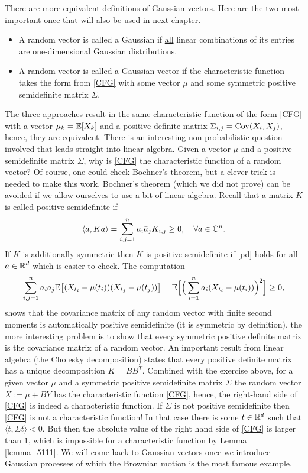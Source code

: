 There are more equivalent definitions of Gaussian vectors. Here are the two most important once that will also be used in next chapter.
\begin{itemize}
	\item A random vector is called a Gaussian if \underline{all} linear combinations of its entries are one-dimensional Gaussian distributions.
	\item A random vector is called a Gaussian vector if the characteristic function takes the form from \eqref{CFG} with some vector $\mu$ and some symmetric positive semidefinite matrix $\Sigma$.
\end{itemize}
The three approaches result in the same characteristic function of the form \eqref{CFG} with a vector $\mu_k=\mathbb{E}[X_k]$ and a positive definite matrix $\Sigma_{i,j}=\operatorname{Cov}(X_i,X_j)$, hence, they are equivalent. There is an interesting non-probabilistic question involved that leads straight into linear algebra. Given a vector $\mu$ and a positive semidefinite matrix $\Sigma$, why is \eqref{CFG} the characteristic function of a random vector? Of course, one could check Bochner's theorem, but a clever trick is needed to make this work. Bochner's theorem (which we did not prove) can be avoided if we allow ourselves to use a bit of linear algebra. Recall that a matrix $K$ is called positive semidefinite if 
\begin{align}\label{pd}
	\langle a, K a\rangle=\sum_{i,j=1}^n a_i\bar{a}_j K_{i,j}\geq 0,\quad \forall a\in \mathbb{C}^n.
\end{align}
If $K$ is additionally symmetric then $K$ is positive semidefinite if \eqref{pd} holds for all $a\in \mathbb{R}^d$ which is easier to check. The computation
\begin{align*}
	\sum_{i,j=1}^n a_ia_j \mathbb{E}\big[(X_{t_i}-\mu(t_i))(X_{t_j}-\mu(t_j))\big]
	=\mathbb{E}\Big[\Big(\sum_{i=1}^n a_i(X_{t_i}-\mu(t_i))\Big)^2 \Big]\geq 0,
\end{align*}
shows that the covariance matrix of any random vector with finite second moments is automatically positive semidefinite (it is symmetric by definition), the more interesting problem is to show that every symmetric positive definite matrix is the covariance matrix of a random vector. An important result from linear algebra (the Cholesky decomposition) states that every positive definite matrix has a unique decomposition $K=BB^T$. Combined with the exercise above, for a given vector $\mu$ and a symmetric positive semidefinite matrix $\Sigma$ the random vector $X:=\mu+B Y$ has the characteristic function \eqref{CFG}, hence, the right-hand side of \eqref{CFG} is indeed a characteristic function. If $\Sigma$ is not positive semidefinite then \eqref{CFG} is not a characteristic function! In that case there is some $t\in \mathbb{R}^d$ such that $\langle t, \Sigma t\rangle<0$. But then the absolute value of the right hand side of \eqref{CFG} is larger than $1$, which is impossible for a characteristic function by Lemma \ref{lemma_5111}. We will come back to Gaussian vectors once we introduce Gaussian processes of which the Brownian motion is the most famous example.

